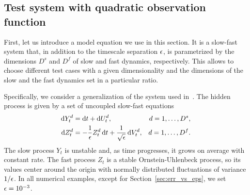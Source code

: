 \documentclass{article}
\begin{document}
\subsection{Test system with quadratic observation function}\label{sec:quad_sde}
First, let us introduce a model equation we use in this section. It is a slow-fast system that, in addition to the timescale separation $\epsilon$, is parametrized by the dimensions $D^s$ and $D^f$ of slow and fast dynamics, respectively. This allows to choose different test cases with a given dimensionality and the dimensions of the slow and the fast dynamics set in a particular ratio.

Specifically, we consider a generalization of the system used in~\cite{dsilva_data-driven_2016}. The hidden process is given by a set of uncoupled slow-fast equations
\begin{gather}\label{eq:quad_hid}
    \begin{aligned}
        \operatorname{d}\!{Y}^d_t &= \operatorname{d}\!{t} + \operatorname{d}\!{U}^d_t, & d=1,\dotsc,D^s,\\
        \operatorname{d}\!{Z}^d_t &= -\frac{1}{\epsilon}Z^d_t\operatorname{d}\!{t} + \frac{1}{\sqrt{\epsilon}}\operatorname{d}\!{V}^d_t, & d=1,\dotsc,D^f.
    \end{aligned}
\end{gather}
The slow process $Y_t$ is unstable and, as time progresses, it grows on average with constant rate. The fast process $Z_t$ is a stable Ornstein-Uhlenbeck process, so its values center around the origin with normally distributed fluctuations of variance $1/\epsilon$. In all numerical examples, except for Section~\ref{sec:err_vs_eps}, we set $\epsilon=10^{-3}$.
\end{document}
